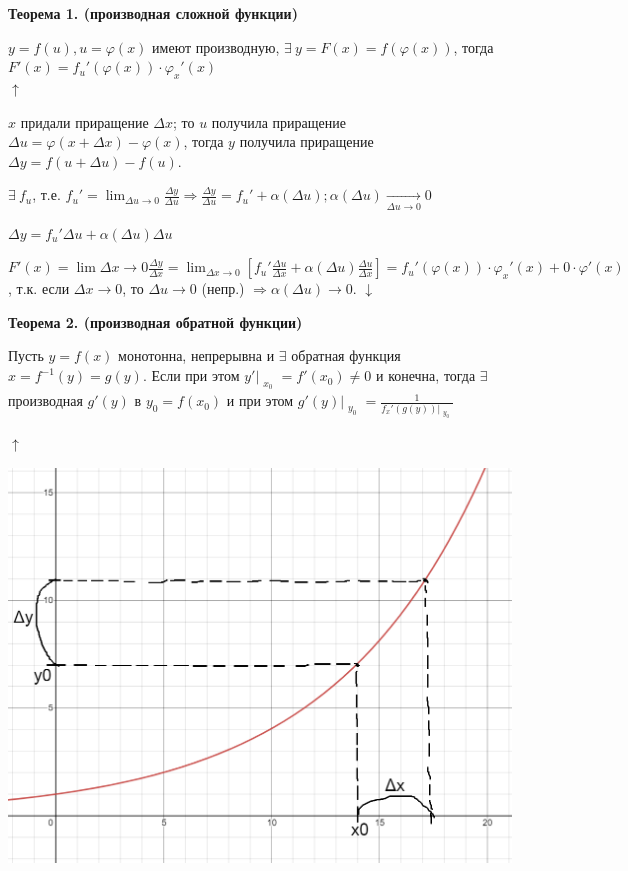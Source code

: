 \documentclass{article}
\begin{document}
    \textbf{Теорема 1. (производная сложной функции)}

    \( y = f(u), u = \varphi(x) \) имеют производную, \( \exists\ y= F(x) = f(\varphi(x)) \), тогда \( F'(x) = f_u'(\varphi(x)) \cdot \varphi_x'(x) \)\\
    \( \uparrow \)
    
    \(x\) придали приращение \(\Delta x\); то \(u\) получила приращение \(\Delta u = \varphi(x + \Delta x) - \varphi(x)\), тогда \(y\) получила приращение \(\Delta y = f(u + \Delta u) - f(u) \).
    
    \(\exists\ f_u\), т.е. \( f_u' = \lim_{\Delta u \to 0} \frac{\Delta y}{\Delta u} \Rightarrow \frac{\Delta y}{\Delta u} = f_u' + \alpha(\Delta u); \alpha(\Delta u) \xrightarrow[\Delta u \to 0]{} 0\)
    
    \(\Delta y = f_u'\Delta u + \alpha(\Delta u)\Delta u\)

    \( F'(x) = \lim{\Delta x \to 0}\frac{\Delta y}{\Delta x} = \lim_{\Delta x \to 0} [f_u'\frac{\Delta u}{\Delta x} + \alpha(\Delta u)\frac{\Delta u}{\Delta x}] = f_u'(\varphi(x)) \cdot \varphi_x'(x) + 0 \cdot \varphi'(x) \), т.к. если \( \Delta x \to 0 \), то \(\Delta u \to 0\) (непр.) \( \Rightarrow \alpha(\Delta u) \to 0 \).
    \(\downarrow\)

    \textbf{Теорема 2. (производная обратной функции)}

    Пусть \( y = f(x) \) монотонна, непрерывна и \(\exists\) обратная функция \( x = f^{-1}(y) = g(y) \). Если при этом \(y'\Bigr|_{\substack{x_0}} = f'(x_0) \neq 0\) и конечна, тогда \(\exists\) производная \( g'(y) \) в \(y_0 = f(x_0)\) и при этом \(g'(y)\Bigr|_{\substack{y_0}} = \frac{1}{f_x'(g(y))\Bigr|_{\substack{y_0}}} \)

    \(\uparrow\)
    
    \includegraphics[scale=0.3]{11_1_9_1.png}
\end{document}
